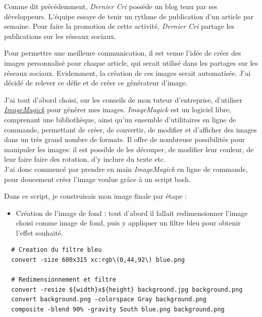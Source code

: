 \documentclass[12pt,a4paper]{article}
\providecommand{\tightlist}{%
  \setlength{\itemsep}{0pt}\setlength{\parskip}{0pt}}
\begin{document}
  \bigskip

  Comme dit précédemment, \emph{Dernier Cri} posséde un blog tenu par ses
  développeurs. L'équipe essaye de tenir un rythme de publication d'un
  article par semaine. Pour faire la promotion de cette activité,
  \emph{Dernier Cri} partage les publications sur les réseaux sociaux.

  \bigskip

  Pour permettre une meilleure communication, il est venue l'idée de créer
  des images personnalisé pour chaque article, qui serait utilisé dans les
  partages sur les réseaux sociaux. Evidemment, la création de ces images
  serait automatisée. J'ai décidé de relever ce défie et de créer ce
  générateur d'image.

  \bigskip

  J'ai tout d'abord choisi, sur les conseils de mon tuteur d'entreprise,
  d'utiliser
  \href{https://www.imagemagick.org/script/index.php}{\emph{ImageMagick}}
  pour générer mes images. \emph{ImageMagick} est un logiciel libre,
  comprenant une bibliothèque, ainsi qu'un ensemble d'utilitaires en ligne
  de commande, permettant de créer, de convertir, de modifier et
  d'afficher des images dans un très grand nombre de formats. Il offre de
  nombreuse possibilités pour manipuler les images: il est possible de les
  découper, de modifier leur couleur, de leur faire faire des rotation,
  d'y inclure du texte etc.\\
  J'ai donc commencé par prendre en main \emph{ImageMagick} en ligne de
  commande, pour doucement créer l'image voulue grâce à un script bash.

  \bigskip

  Dans ce script, je construisais mon image finale par étape :

  \begin{itemize}
  \tightlist
  \item
    Création de l'image de fond : tout d'abord il fallait redimensionner
    l'image choisi comme image de fond, puis y appliquer un filtre bleu
    pour obtenir l'effet souhaité.
  \end{itemize}

  \begin{verbatim}
  # Creation du filtre bleu
  convert -size 600x315 xc:rgb\(0,44,92\) blue.png

  # Redimensionnement et filtre
  convert -resize ${width}x${height} background.jpg background.png
  convert background.png -colorspace Gray background.png
  composite -blend 90% -gravity South blue.png background.png
  \end{verbatim}
\end{document}
